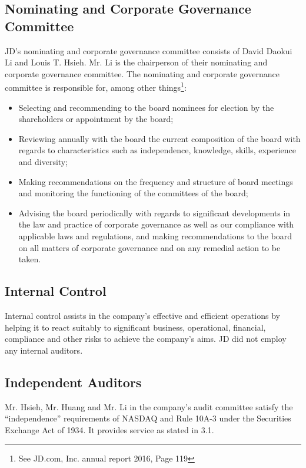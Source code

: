\subsection{Nominating and Corporate Governance Committee}
JD’s nominating and corporate governance committee consists of David Daokui Li and Louis T. Hsieh. Mr. Li is the chairperson of their nominating and corporate governance committee. The nominating and corporate governance committee is responsible for, among other things\footnote{See JD.com, Inc. annual report 2016, Page 119}:
\begin{itemize}
\item	Selecting and recommending to the board nominees for election by the shareholders or appointment by the board;
\item	Reviewing annually with the board the current composition of the board with regards to characteristics such as independence, knowledge, skills, experience and diversity;
\item	Making recommendations on the frequency and structure of board meetings and monitoring the functioning of the committees of the board;
\item	Advising the board periodically with regards to significant developments in the law and practice of corporate governance as well as our compliance with applicable laws and regulations, and making recommendations to the board on all matters of corporate governance and on any remedial action to be taken.
\end{itemize}

\subsection{Internal Control}
Internal control assists in the company’s effective and efficient operations by helping it to react suitably to significant business, operational, financial, compliance and other risks to achieve the company’s aims. JD did not employ any internal auditors.


\subsection{Independent Auditors}
Mr. Hsieh, Mr. Huang and Mr. Li in the company’s audit committee satisfy the “independence” requirements of NASDAQ and Rule 10A-3 under the Securities Exchange Act of 1934. It provides service as stated in 3.1.




